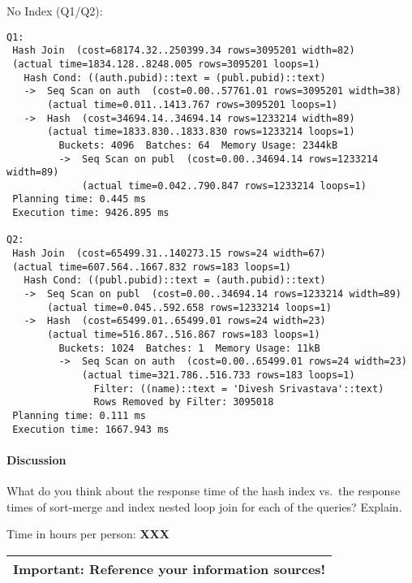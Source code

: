 \documentclass[11pt]{scrartcl}
\begin{document}
\noindent No Index (Q1/Q2):
{\small
\begin{verbatim}
Q1:
 Hash Join  (cost=68174.32..250399.34 rows=3095201 width=82) 
 (actual time=1834.128..8248.005 rows=3095201 loops=1)
   Hash Cond: ((auth.pubid)::text = (publ.pubid)::text)
   ->  Seq Scan on auth  (cost=0.00..57761.01 rows=3095201 width=38)
       (actual time=0.011..1413.767 rows=3095201 loops=1)
   ->  Hash  (cost=34694.14..34694.14 rows=1233214 width=89) 
       (actual time=1833.830..1833.830 rows=1233214 loops=1)
         Buckets: 4096  Batches: 64  Memory Usage: 2344kB
         ->  Seq Scan on publ  (cost=0.00..34694.14 rows=1233214 width=89)
             (actual time=0.042..790.847 rows=1233214 loops=1)
 Planning time: 0.445 ms
 Execution time: 9426.895 ms

Q2:
 Hash Join  (cost=65499.31..140273.15 rows=24 width=67) 
 (actual time=607.564..1667.832 rows=183 loops=1)
   Hash Cond: ((publ.pubid)::text = (auth.pubid)::text)
   ->  Seq Scan on publ  (cost=0.00..34694.14 rows=1233214 width=89) 
       (actual time=0.045..592.658 rows=1233214 loops=1)
   ->  Hash  (cost=65499.01..65499.01 rows=24 width=23) 
       (actual time=516.867..516.867 rows=183 loops=1)
         Buckets: 1024  Batches: 1  Memory Usage: 11kB
         ->  Seq Scan on auth  (cost=0.00..65499.01 rows=24 width=23) 
             (actual time=321.786..516.733 rows=183 loops=1)
               Filter: ((name)::text = 'Divesh Srivastava'::text)
               Rows Removed by Filter: 3095018
 Planning time: 0.111 ms
 Execution time: 1667.943 ms

\end{verbatim}

}

\paragraph{Discussion}

What do you think about the response time of the hash index vs.\ the
response times of sort-merge and index nested loop join for each of
the queries? Explain.

\bigskip

\noindent Time in hours per person: {\bf XXX}

\bigskip

\begin{center}
  \begin{tabular}{c}
    \hline
    {\bf Important:} Reference your information sources!
    \\\hline
  \end{tabular}
\end{center}
\end{document}
